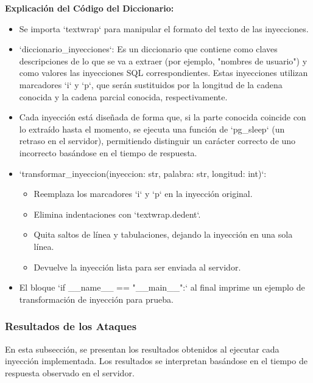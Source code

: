 \documentclass[a4paper,12pt]{article}
\begin{document}
\textbf{Explicación del Código del Diccionario:}  
\begin{itemize}
\item Se importa `textwrap` para manipular el formato del texto de las inyecciones.
\item `diccionario\_inyecciones`: Es un diccionario que contiene como claves descripciones de lo que se va a extraer (por ejemplo, "nombres de usuario") y como valores las inyecciones SQL correspondientes. Estas inyecciones utilizan marcadores `{i}` y `{p}`, que serán sustituidos por la longitud de la cadena conocida y la cadena parcial conocida, respectivamente.
\item Cada inyección está diseñada de forma que, si la parte conocida coincide con lo extraído hasta el momento, se ejecuta una función de `pg\_sleep` (un retraso en el servidor), permitiendo distinguir un carácter correcto de uno incorrecto basándose en el tiempo de respuesta.
\item `transformar\_inyeccion(inyeccion: str, palabra: str, longitud: int)`:
  \begin{itemize}
  \item Reemplaza los marcadores `{i}` y `{p}` en la inyección original.
  \item Elimina indentaciones con `textwrap.dedent`.
  \item Quita saltos de línea y tabulaciones, dejando la inyección en una sola línea.
  \item Devuelve la inyección lista para ser enviada al servidor.
  \end{itemize}
\item El bloque `if \_\_name\_\_ == "\_\_main\_\_":` al final imprime un ejemplo de transformación de inyección para prueba.
\end{itemize}



\subsubsection{Resultados de los Ataques}
\label{subsec:resultados_ataques}

En esta subsección, se presentan los resultados obtenidos al ejecutar cada inyección implementada. Los resultados se interpretan basándose en el tiempo de respuesta observado en el servidor.
\end{document}
